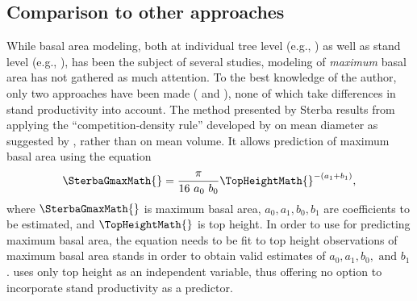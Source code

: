 \subsection{Comparison to other approaches}

While basal area modeling, both at individual tree level (e.g., \textcite{Andreassen2003,Hein2006,Jogiste2000,Monserud1996,Nystroem1997,Schroeder2002,Wimberly1996}) as well as stand level (e.g., \textcite{Castedo-Dorado2007,Chikumbo2001,Chikumbo1999,Eerikaeinen2003}), has been the subject of several studies, modeling of \emph{maximum} basal area has not gathered as much attention.  To the best knowledge of the author, only two approaches have been made (\textcite{Sterba1975,Sterba1987,Sterba1981} and \textcite{Woerdehoff2016}), none of which take differences in stand productivity into account.
The method presented by Sterba results from applying the “competition-density rule” developed by \textcite{Kira1953,Ando1968,Ando1968a,Tadaki1963} on mean diameter as suggested by \textcite{Goulding1972}, rather than on mean volume.  It allows prediction of maximum basal area using the equation
\begin{equation}
  \label{eq:SterbaGmax}
  \SterbaGmaxMath{} = \frac{\pi}{16~a_0~b_0} \TopHeightMath{} ^ {-(a_1 + b_1)},
\end{equation}
where \(\SterbaGmaxMath{}\) is maximum basal area, \(a_0, a_1, b_0, b_1\) are coefficients to be estimated, and \(\TopHeightMath{}\) is top height.
In order to use  for predicting maximum basal area, the equation needs to be fit to top height observations of maximum basal area stands in order to obtain valid estimates of \(a_0, a_1, b_0, \text{ and } b_1\).    uses only top height as an independent variable, thus offering no option to incorporate stand productivity as a predictor.
